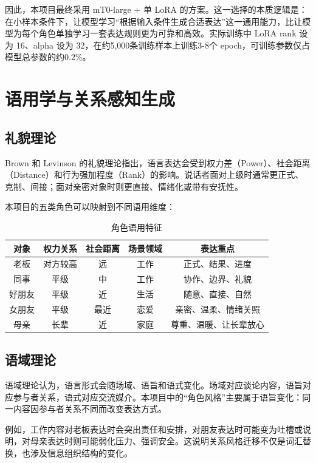 \documentclass[12pt,a4paper]{ctexart}
\begin{document}
因此，本项目最终采用 mT0-large + 单 LoRA 的方案。这一选择的本质逻辑是：在小样本条件下，让模型学习“根据输入条件生成合适表达”这一通用能力，比让模型为每个角色单独学习一套表达规则更为可靠和高效。实际训练中 LoRA rank 设为 16、alpha 设为 32，在约5,000条训练样本上训练3-8个 epoch，可训练参数仅占模型总参数的约0.2\%。

\section{语用学与关系感知生成}

\subsection{礼貌理论}

Brown 和 Levinson 的礼貌理论指出，语言表达会受到权力差（Power）、社会距离（Distance）和行为强加程度（Rank）的影响。说话者面对上级时通常更正式、克制、间接；面对亲密对象时则更直接、情绪化或带有安抚性。

本项目的五类角色可以映射到不同语用维度：

\begin{table}[H]
\centering
\caption{角色语用特征}
\begin{tabular}{c|c|c|c|c}
\toprule
对象 & 权力关系 & 社会距离 & 场景领域 & 表达重点 \\
\midrule
老板 & 对方较高 & 远 & 工作 & 正式、结果、进度 \\
同事 & 平级 & 中 & 工作 & 协作、边界、礼貌 \\
好朋友 & 平级 & 近 & 生活 & 随意、直接、自然 \\
女朋友 & 平级 & 最近 & 恋爱 & 亲密、温柔、情绪关照 \\
母亲 & 长辈 & 近 & 家庭 & 尊重、温暖、让长辈放心 \\
\bottomrule
\end{tabular}
\end{table}

\subsection{语域理论}

语域理论认为，语言形式会随场域、语旨和语式变化。场域对应谈论内容，语旨对应参与者关系，语式对应交流媒介。本项目中的“角色风格”主要属于语旨变化：同一内容因参与者关系不同而改变表达方式。

例如，工作内容对老板表达时会突出责任和安排，对朋友表达时可能变为吐槽或说明，对母亲表达时则可能弱化压力、强调安全。这说明关系风格迁移不仅是词汇替换，也涉及信息组织结构的变化。
\end{document}
